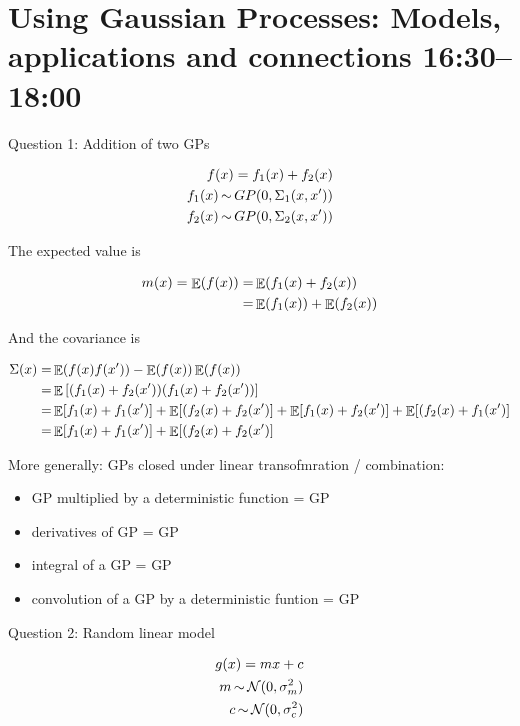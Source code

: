 \documentclass[b5paper]{report}
\begin{document}
\section{Using Gaussian Processes: Models, applications and connections
16:30--18:00}

Question 1: Addition of two GPs

\begin{align}
  f(x) = f_1(x) + f_2(x) \\
  f_1(x) \operatorname*{\sim} GP(0, \Sigma_1(x,x')) \\
  f_2(x) \operatorname*{\sim} GP(0, \Sigma_2(x,x'))
\end{align}

The expected value is

\begin{align}
  m(x) = \operatorname*{\mathbb{\mathop{E}}}(f(x)) =& \operatorname*{\mathbb{\mathop{E}}}(f_1(x) + f_2(x)) \\
  =& \operatorname*{\mathbb{\mathop{E}}}(f_1(x)) + \operatorname*{\mathbb{\mathop{E}}}(f_2(x))
\end{align}

And the covariance is

\begin{align}
\Sigma(x) =& \operatorname*{\mathbb{\mathop{E}}}(f(x)f(x')) - \operatorname*{\mathbb{\mathop{E}}}(f(x))\operatorname*{\mathbb{\mathop{E}}}(f(x)) \\
=& \operatorname*{\mathbb{\mathop{E}}}\left[\left(f_1(x) + f_2(x'))(f_1(x) + f_2(x')\right)\right] \\
=& \operatorname*{\mathbb{\mathop{E}}}[f_1(x) + f_1(x')] + \operatorname*{\mathbb{\mathop{E}}}[(f_2(x) + f_2(x')] + \operatorname*{\mathbb{\mathop{E}}}[f_1(x) + f_2(x')] + \operatorname*{\mathbb{\mathop{E}}}[(f_2(x) + f_1(x')] \\
=& \operatorname*{\mathbb{\mathop{E}}}[f_1(x) + f_1(x')] + \operatorname*{\mathbb{\mathop{E}}}[(f_2(x) + f_2(x')]
\end{align}

More generally: GPs closed under linear transofmration / combination:

\begin{itemize}
  \item GP multiplied by a deterministic function = GP
  \item derivatives of GP = GP
  \item integral of a GP = GP
  \item convolution of a GP by a deterministic funtion = GP
\end{itemize}

Question 2: Random linear model

\begin{align}
  g(x) = mx + c \\
  m \operatorname*{\sim} \operatorname*{\mathcal{N}}(0, \sigma_m^2) \\
  c \operatorname*{\sim} \operatorname*{\mathcal{N}}(0, \sigma_c^2)
\end{align}
\end{document}
